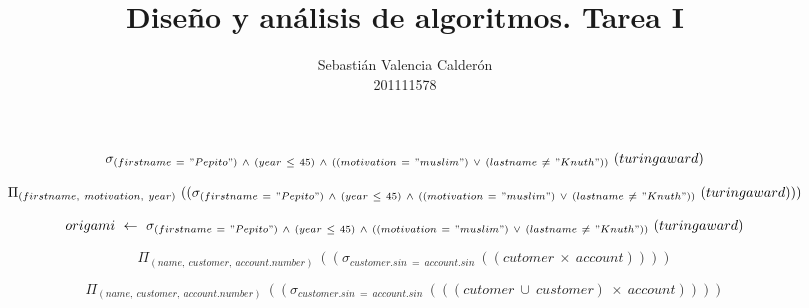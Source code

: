 \documentclass{article}
\title{Diseño y análisis de algoritmos. Tarea I}
\author{Sebastián Valencia Calderón\\
	\small 201111578
}
\theoremstyle{definition}
\theoremstyle{remark}
\begin{document}
	\thispagestyle{empty}
	
	\begin{landscape}
		$$\sigma_{(firstname\ =\ "Pepito")\ \wedge\ (year\ \leq\ 45)\ \wedge\ ((motivation\ =\ "muslim")\ \vee\ (lastname\ \neq\ "Knuth"))}\ (turingaward)$$
		
		$$\Pi_{(firstname,\ motivation,\ year)}\ ((\sigma_{(firstname\ =\ "Pepito")\ \wedge\ (year\ \leq\ 45)\ \wedge\ ((motivation\ =\ "muslim")\ \vee\ (lastname\ \neq\ "Knuth"))}\ (turingaward)))$$
		
		$$origami\ \leftarrow\ \sigma_{(firstname\ =\ "Pepito")\ \wedge\ (year\ \leq\ 45)\ \wedge\ ((motivation\ =\ "muslim")\ \vee\ (lastname\ \neq\ "Knuth"))}\ (turingaward)$$
		
		$$\Pi_{(name,\ customer,\ account.number)}\ ((\sigma_{customer.sin\ =\ account.sin}\ ((cutomer\ \times\ account))))$$
		
		$$\Pi_{(name,\ customer,\ account.number)}\ ((\sigma_{customer.sin\ =\ account.sin}\ (((cutomer\ \cup\ customer)\ \times\ account))))$$
		
	\end{landscape}
\end{document}
